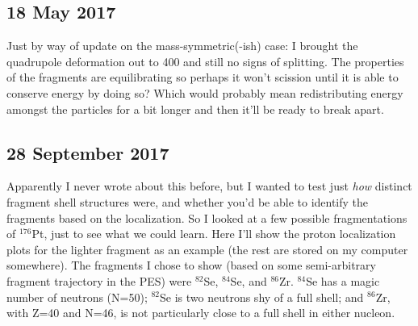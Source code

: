 \subsection*{18 May 2017}

Just by way of update on the mass-symmetric(-ish) case: I brought the quadrupole deformation out to 400 and still no signs of splitting. The properties of the fragments are equilibrating so perhaps it won't scission until it is able to conserve energy by doing so? Which would probably mean redistributing energy amongst the particles for a bit longer and then it'll be ready to break apart.

\subsection*{28 September 2017}

Apparently I never wrote about this before, but I wanted to test just \textit{how} distinct fragment shell structures were, and whether you'd be able to identify the fragments based on the localization. So I looked at a few possible fragmentations of $^{176}$Pt, just to see what we could learn. Here I'll show the proton localization plots for the lighter fragment as an example (the rest are stored on my computer somewhere). The fragments I chose to show (based on some semi-arbitrary fragment trajectory in the PES) were $^{82}$Se, $^{84}$Se, and $^{86}$Zr. $^{84}$Se has a magic number of neutrons (N=50); $^{82}$Se is two neutrons shy of a full shell; and $^{86}$Zr, with Z=40 and N=46, is not particularly close to a full shell in either nucleon.

